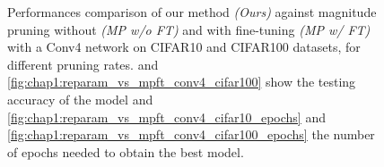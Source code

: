 \begin{figure}
  \caption{\centering Performances comparison of our method {\em(Ours)} against
  magnitude pruning without {\em(MP w/o FT)} and with fine-tuning {\em(MP w/ FT)} with a Conv4 network on
  CIFAR10 and CIFAR100 datasets, for different pruning rates.
   and
  \cref{fig:chap1:reparam_vs_mpft_conv4_cifar100} show the testing accuracy of
  the model and \cref{fig:chap1:reparam_vs_mpft_conv4_cifar10_epochs} and
  \cref{fig:chap1:reparam_vs_mpft_conv4_cifar100_epochs} the number of epochs
  needed to obtain the best model.}
  \label{fig:chap1:reparam_vs_mpft_conv4}
\end{figure}

\begin{figure}
  \centering
  \\

\end{figure}
